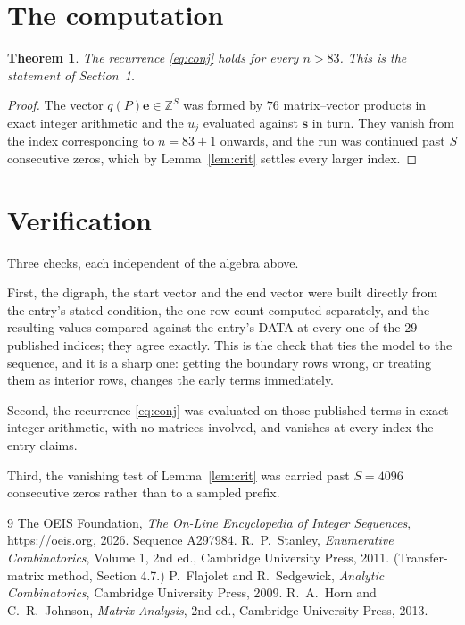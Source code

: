 \documentclass[11pt,a4paper]{article}
\theoremstyle{plain}
\newtheorem{theorem}{Theorem}
\theoremstyle{definition}
\begin{document}
\section{The computation}

\begin{theorem}
The recurrence \eqref{eq:conj} holds for every $n>83$. This is the statement of
Section~1.
\end{theorem}

\begin{proof}
The vector $q(P)\mathbf{e}\in\mathbb{Z}^{S}$ was formed by $76$ matrix--vector
products in exact integer arithmetic and the $u_j$ evaluated against $\mathbf{s}$ in turn.
They vanish from the index corresponding to $n=83+1$ onwards, and the run was continued
past $S$ consecutive zeros, which by Lemma~\ref{lem:crit} settles every larger index.
\end{proof}

\section{Verification}

Three checks, each independent of the algebra above.

First, the digraph, the start vector and the end vector were built directly from the
entry's stated condition, the one-row count computed separately, and the resulting values
compared against the entry's DATA at every one of the $29$ published indices; they
agree exactly. This is the check that ties the model to the sequence, and it is a sharp one:
getting the boundary rows wrong, or treating them as interior rows, changes the early terms
immediately.

Second, the recurrence \eqref{eq:conj} was evaluated on those published terms in exact
integer arithmetic, with no matrices involved, and vanishes at every index the entry claims.

Third, the vanishing test of Lemma~\ref{lem:crit} was carried past $S=4096$ consecutive
zeros rather than to a sampled prefix.

\begin{thebibliography}{9}
 The OEIS Foundation, \emph{The On-Line Encyclopedia of Integer
Sequences}, \url{https://oeis.org}, 2026. Sequence A297984.
 R.~P.~Stanley, \emph{Enumerative Combinatorics}, Volume 1, 2nd ed.,
Cambridge University Press, 2011. (Transfer-matrix method, Section 4.7.)
 P.~Flajolet and R.~Sedgewick, \emph{Analytic Combinatorics}, Cambridge
University Press, 2009.
 R.~A.~Horn and C.~R.~Johnson, \emph{Matrix Analysis}, 2nd ed., Cambridge
University Press, 2013.
\end{thebibliography}
\end{document}
